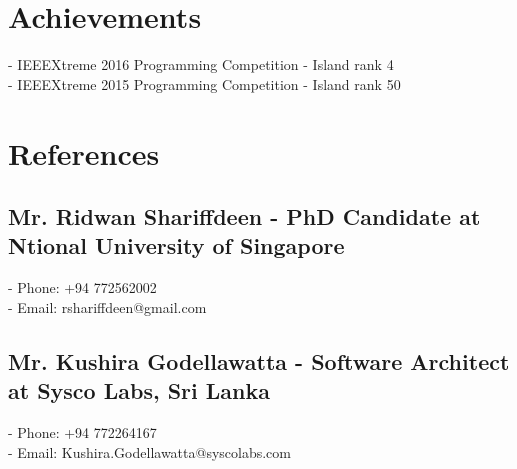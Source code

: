 \documentclass[letterpaper]{twentysecondcv} %
\begin{document}
%
%

%


    \newpage %


    \smallskip

    \section{Achievements}

    - IEEEXtreme 2016 Programming Competition - Island rank 4
    \newline
    \\- IEEEXtreme 2015 Programming Competition - Island rank 50



    \section{References}

    \subsection{Mr. Ridwan Shariffdeen - PhD Candidate at Ntional University of Singapore}
    - Phone: +94 772562002
    \newline
    \\- Email: rshariffdeen@gmail.com

    \subsection{Mr. Kushira Godellawatta - Software Architect at Sysco Labs, Sri Lanka}
    - Phone: +94 772264167
    \newline
    \\- Email: Kushira.Godellawatta@syscolabs.com
\end{document}
